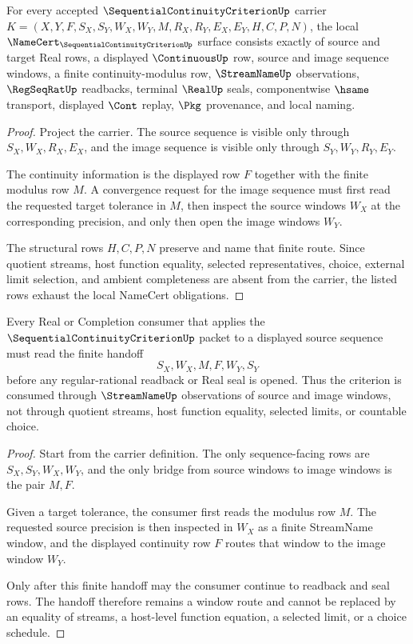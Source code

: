 \begin{theorem}
\label{thm:sequential-continuity-criterion-namecert-obligations}
For every accepted $\SequentialContinuityCriterionUp$ carrier $K=(X,Y,F,S_X,S_Y,W_X,W_Y,M,R_X,R_Y,E_X,E_Y,H,C,P,N)$, the local $\NameCert_{\SequentialContinuityCriterionUp}$ surface consists exactly of source and target Real rows, a displayed $\ContinuousUp$ row, source and image sequence windows, a finite continuity-modulus row, $\StreamNameUp$ observations, $\RegSeqRatUp$ readbacks, terminal $\RealUp$ seals, componentwise $\hsame$ transport, displayed $\Cont$ replay, $\Pkg$ provenance, and local naming.
\end{theorem}
\begin{proof}
Project the carrier. The source sequence is visible only through $S_X,W_X,R_X,E_X$, and the image sequence is visible only through $S_Y,W_Y,R_Y,E_Y$.

The continuity information is the displayed row $F$ together with the finite modulus row $M$. A convergence request for the image sequence must first read the requested target tolerance in $M$, then inspect the source windows $W_X$ at the corresponding precision, and only then open the image windows $W_Y$.

The structural rows $H,C,P,N$ preserve and name that finite route. Since quotient streams, host function equality, selected representatives, choice, external limit selection, and ambient completeness are absent from the carrier, the listed rows exhaust the local NameCert obligations.
\end{proof}

\begin{theorem}
\label{thm:sequential-continuity-criterion-streamname-handoff}
Every Real or Completion consumer that applies the $\SequentialContinuityCriterionUp$ packet to a displayed source sequence must read the finite handoff
$$
S_X,W_X,M,F,W_Y,S_Y
$$
before any regular-rational readback or Real seal is opened. Thus the criterion is consumed through $\StreamNameUp$ observations of source and image windows, not through quotient streams, host function equality, selected limits, or countable choice.
\end{theorem}
\begin{proof}
Start from the carrier definition. The only sequence-facing rows are $S_X,S_Y,W_X,W_Y$, and the only bridge from source windows to image windows is the pair $M,F$.

Given a target tolerance, the consumer first reads the modulus row $M$. The requested source precision is then inspected in $W_X$ as a finite StreamName window, and the displayed continuity row $F$ routes that window to the image window $W_Y$.

Only after this finite handoff may the consumer continue to readback and seal rows. The handoff therefore remains a window route and cannot be replaced by an equality of streams, a host-level function equation, a selected limit, or a choice schedule.
\end{proof}


